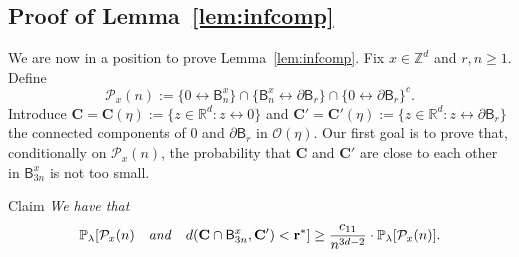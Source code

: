 \documentclass[AHL,Unicode,longabstracts]{cedram}
\newcommand{\rbf}{\mathbf{r}}
\newcommand{\Cbf}{\mathbf{C}}
\begin{document}
\subsection{Proof of Lemma~\ref{lem:infcomp}}\label{sec:lemma}
We are now in a position to prove Lemma~\ref{lem:infcomp}. Fix $x \in {\mathbb Z}^d$ and $r,n\ge1$. Define
\[
{\mathcal P}_x(n):=\{0\longleftrightarrow \mathsf B_{n}^x\}\cap\{\mathsf B_n^x \longleftrightarrow \partial \mathsf B_r\}\cap\{0 \longleftrightarrow \partial \mathsf B_r\}^c.
\]
Introduce ${\Cbf}={\Cbf}(\eta) := \{z \in {\mathbb R}^d: z \stackrel{}{\longleftrightarrow} 0\}$ and ${\Cbf}'={\Cbf}'(\eta):=\{z \in{\mathbb R}^d: z \stackrel{}{\longleftrightarrow} \partial\mathsf B_r\}$ the connected components of 0 and $\partial\mathsf B_r$ in ${\mathcal O}(\eta)$. Our first goal is to prove that, conditionally on ${\mathcal P}_x(n)$, the probability that ${\Cbf}$ and ${\Cbf}'$ are close to each other in $\mathsf B^x_{3n}$ is not too small.


\begin{enonce}[plain]{Claim}\label{claim310}
\emph{We have that}
\[
{\mathbb P}_\lambda[{\mathcal P}_x(n)\quad\text{\emph{and}}\quad d({\Cbf}\cap\mathsf B^x_{3n},{\Cbf}')<\rbf^{*}]\ge \frac{c_{11}}{n^{3d-2}}\cdot{\mathbb P}_\lambda[{\mathcal P}_x(n)].
\]
\end{enonce}
\end{document}
